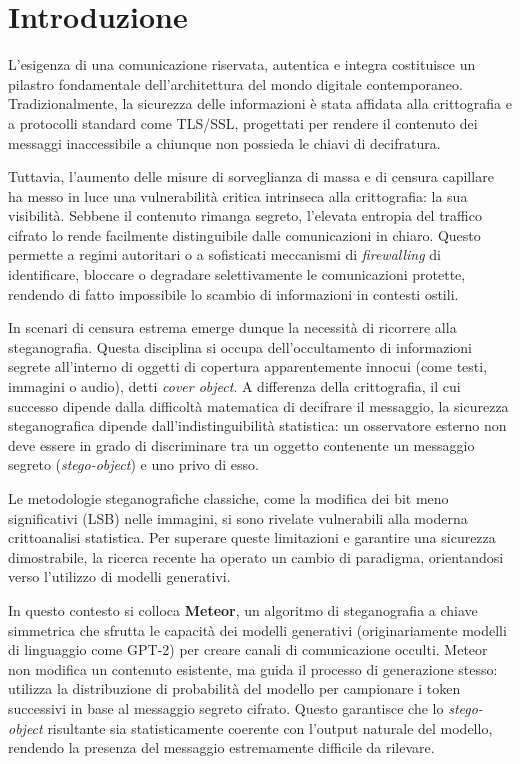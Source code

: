
\chapter{Introduzione}
L'esigenza di una comunicazione riservata, autentica e integra costituisce un pilastro fondamentale dell'architettura del mondo digitale contemporaneo. Tradizionalmente, la sicurezza delle informazioni è stata affidata alla crittografia e a protocolli standard come TLS/SSL, progettati per rendere il contenuto dei messaggi inaccessibile a chiunque non possieda le chiavi di decifratura.

Tuttavia, l'aumento delle misure di sorveglianza di massa e di censura capillare ha messo in luce una vulnerabilità critica intrinseca alla crittografia: la sua visibilità. Sebbene il contenuto rimanga segreto, l'elevata entropia del traffico cifrato lo rende facilmente distinguibile dalle comunicazioni in chiaro. Questo permette a regimi autoritari o a sofisticati meccanismi di \emph{firewalling} di identificare, bloccare o degradare selettivamente le comunicazioni protette, rendendo di fatto impossibile lo scambio di informazioni in contesti ostili.

In scenari di censura estrema emerge dunque la necessità di ricorrere alla steganografia. Questa disciplina si occupa dell'occultamento di informazioni segrete all'interno di oggetti di copertura apparentemente innocui (come testi, immagini o audio), detti \emph{cover object}. A differenza della crittografia, il cui successo dipende dalla difficoltà matematica di decifrare il messaggio, la sicurezza steganografica dipende dall'indistinguibilità statistica: un osservatore esterno non deve essere in grado di discriminare tra un oggetto contenente un messaggio segreto (\emph{stego-object}) e uno privo di esso.

Le metodologie steganografiche classiche, come la modifica dei bit meno significativi (LSB) nelle immagini, si sono rivelate vulnerabili alla moderna crittoanalisi statistica. Per superare queste limitazioni e garantire una sicurezza dimostrabile, la ricerca recente ha operato un cambio di paradigma, orientandosi verso l'utilizzo di modelli generativi.

In questo contesto si colloca \textbf{Meteor}, un algoritmo di steganografia a chiave simmetrica che sfrutta le capacità dei modelli generativi (originariamente modelli di linguaggio come GPT-2) per creare canali di comunicazione occulti. Meteor non modifica un contenuto esistente, ma guida il processo di generazione stesso: utilizza la distribuzione di probabilità del modello per campionare i token successivi in base al messaggio segreto cifrato. Questo garantisce che lo \emph{stego-object} risultante sia statisticamente coerente con l'output naturale del modello, rendendo la presenza del messaggio estremamente difficile da rilevare.

